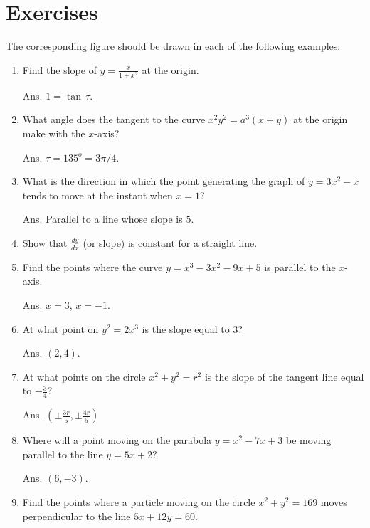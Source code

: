 \section{Exercises}

The corresponding figure should be drawn in each of the following 
examples:

\begin{enumerate}

\item
Find the slope of 
$y = \frac{x}{1 + x^2}$ at the origin. 

Ans. $1 = \tan\, \tau$.

\item
What angle does the tangent to the curve 
$x^2y^2 = a^3(x + y)$ at the origin make with the %
$x$-axis?

Ans. $\tau = 135^o=3\pi/4$.

\item
What is the direction in which the point generating the 
graph of $y = 3x^2 - x$ tends to move at the instant when $x = 1$? 

Ans. Parallel to a line whose slope is $5$.

\item
Show that $\frac{dy}{dx}$ (or slope) is constant for a straight line.

\item
Find the points where the curve $y = x^3 - 3x^2 - 9x + 5$ 
is parallel to the %
$x$-axis.

Ans. $x = 3$, $x = -1$.

\item
At what point on $y^2 = 2x^3$ is the slope equal to $3$? 

Ans. $(2, 4)$.

\item
At what points on the circle $x^2 + y^2 = r^2$ is the 
slope of the tangent line equal to $-\frac{3}{4}$? 

Ans. $\left ( \pm \frac{3r}{5}, \pm \frac{4r}{5} \right )$

\item
Where will a point moving on the parabola $y = x^2 - 7x + 3$ 
be moving parallel to the line $y = 5x + 2$? 

Ans. $(6, -3)$.

\item
Find the points where a particle moving on the circle 
$x^2 + y^2 = 169$ moves perpendicular to the line 
$5x + 12y = 60$. 


\end{enumerate}
